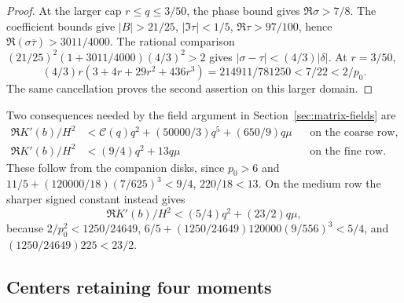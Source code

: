 \begin{proof}
At the larger cap $r\le q\le3/50$, the phase bound gives
$\Re\sigma>7/8$. The coefficient bounds give
$|B|>21/25$, $|\Im\tau|<1/5$, $\Re\tau>97/100$, hence
$\Re(\sigma\overline\tau)>3011/4000$.
The rational comparison
$(21/25)^2(1+3011/4000)(4/3)^2>2$ gives
$|\sigma-\tau|<(4/3)|\delta|$. At $r=3/50$,
\[
 (4/3)r(3+4r+29r^2+436r^3)=214911/781250<7/22<2/p_0.
\]
The same cancellation proves the second assertion on this larger domain.
\end{proof}

Two consequences needed by the field argument in Section~\ref{sec:matrix-fields}
are
\begin{align}
 \Re K'(b)/H^2&<\mathcal C(q)q^2+(50000/3)q^5+(650/9)q\mu
 &&\text{on the coarse row},\label{lt:coarse-curvature}\\
 \Re K'(b)/H^2&<(9/4)q^2+13q\mu
 &&\text{on the fine row}.\label{lt:fine-curvature}
\end{align}
These follow from the companion disks, since $p_0>6$ and
$11/5+(120000/18)(7/625)^3<9/4$, $220/18<13$.
On the medium row the sharper signed constant instead gives
\begin{equation}\label{lt:medium-curvature}
 \Re K'(b)/H^2<(5/4)q^2+(23/2)q\mu,
\end{equation}
because $2/p_0^2<1250/24649$,
$6/5+(1250/24649)120000(9/556)^3<5/4$, and
$(1250/24649)225<23/2$.

\subsection{Centers retaining four moments}

